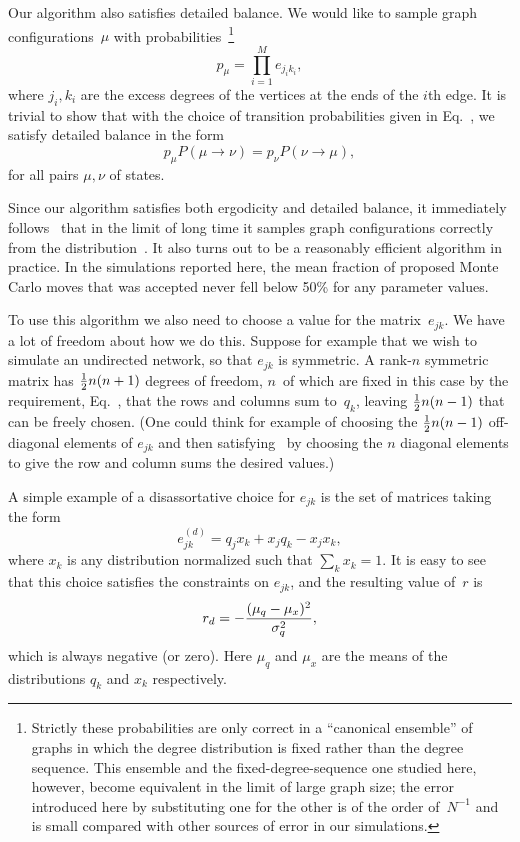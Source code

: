 \documentclass[twocolumn,pre]{revtex4}
\begin{document}
Our algorithm also satisfies detailed balance.  We would like to sample
graph configurations~$\mu$ with probabilities~\footnote{Strictly these
probabilities are only correct in a ``canonical ensemble'' of graphs in
which the degree distribution is fixed rather than the degree sequence.
This ensemble and the fixed-degree-sequence one studied here, however,
become equivalent in the limit of large graph size; the error introduced
here by substituting one for the other is of the order of~$N^{-1}$ and is
small compared with other sources of error in our simulations.}
\begin{equation}
p_\mu = \prod_{i=1}^M e_{j_ik_i},
\label{defspmu}
\end{equation}
where $j_i,k_i$ are the excess degrees of the vertices at the ends of the
$i$th edge.  It is trivial to show that with the choice of transition
probabilities given in Eq.~, we satisfy detailed balance
in the form
\begin{equation}
p_\mu P(\mu\to\nu) = p_\nu P(\nu\to\mu),
\end{equation}
for all pairs $\mu,\nu$ of states.

Since our algorithm satisfies both ergodicity and detailed balance, it
immediately follows~\cite{NB99} that in the limit of long time it samples
graph configurations correctly from the distribution~.  It
also turns out to be a reasonably efficient algorithm in practice.  In the
simulations reported here, the mean fraction of proposed Monte Carlo moves
that was accepted never fell below 50\% for any parameter values.

To use this algorithm we also need to choose a value for the
matrix~$e_{jk}$.  We have a lot of freedom about how we do this.  Suppose
for example that we wish to simulate an undirected network, so that
$e_{jk}$ is symmetric.  A rank-$n$ symmetric matrix has $\mbox{$\frac12$} n(n+1)$
degrees of freedom, $n$~of which are fixed in this case by the requirement,
Eq.~, that the rows and columns sum to~$q_k$, leaving
$\mbox{$\frac12$} n(n-1)$ that can be freely chosen.  (One could think for example of
choosing the $\mbox{$\frac12$} n(n-1)$ off-diagonal elements of $e_{jk}$ and then
satisfying~ by choosing the $n$ diagonal elements to give
the row and column sums the desired values.)

A simple example of a disassortative choice for $e_{jk}$ is the set of
matrices taking the form
\begin{equation}
e_{jk}^{(d)} = q_j x_k + x_j q_k - x_j x_k,
\label{simple}
\end{equation}
where $x_k$ is any distribution normalized such that $\sum_k x_k=1$.  It is
easy to see that this choice satisfies the constraints on $e_{jk}$, and the
resulting value of~$r$ is
\begin{equation}
r_d = -{(\mu_q-\mu_x)^2\over\sigma_q^2},
\end{equation}
which is always negative (or zero).  Here $\mu_q$ and $\mu_x$ are the means
of the distributions $q_k$ and $x_k$ respectively.
\end{document}
